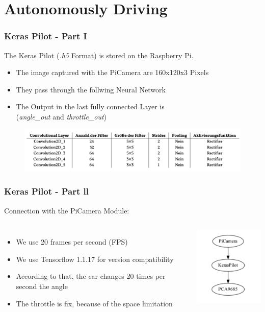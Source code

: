 \documentclass{beamer}
\begin{document}
\section{Autonomously Driving}
%
\begin{frame}
\frametitle{Keras Pilot - Part I}
The Keras Pilot (\textit{.h5} Format) is stored on the Raspberry Pi. 
\begin{itemize}
\item The image captured with the PiCamera are 160x120x3 Pixels
\item They pass through the follwing Neural Network
\item The Output in the last fully connected Layer is \\ (\textit{angle\_out} and \textit{throttle\_out})
\end{itemize}
\begin{figure}
\includegraphics[width=1\linewidth]{photo/cnn_table}
\end{figure}
\end{frame}
\begin{frame}
\frametitle{Keras Pilot - Part ll}
Connection with the PiCamera Module:
\begin{columns}[c] %
\begin{itemize}
\item We use 20 frames per second (FPS)
\item We use Tensorflow 1.1.17 for version compatibility
\item According to that, the car changes 20 times per second the angle
\item The throttle is fix, because of the space limitation
\end{itemize}
\begin{center}
	\includegraphics[width=4cm]{photo/autonom}
\end{center}
\end{columns}
\end{frame}
\end{document}

